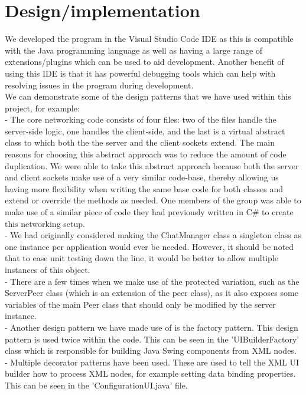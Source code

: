 \documentclass{COMPXXXX}
\begin{document}
\section{Design/implementation}
\normalsize \textrm {We developed the program in the Visual Studio Code IDE as this is compatible with the Java programming language as well as having a large range of extensions/plugins which can be used to aid development. Another benefit of using this IDE is that it has powerful debugging tools which can help with resolving issues in the program during development.\\
We can demonstrate some of the design patterns that we have used within this project, for example:\\
- The core networking code consists of four files: two of the files handle the server-side logic, one handles the client-side, and the last is a virtual abstract class to which both the the server and the client sockets extend. The main reasons for choosing this abstract approach was to reduce the amount of code duplication. We were able to take this abstract approach because both the server and client sockets make use of a very similar code-base, thereby allowing us having more flexibility when writing the same base code for both classes and extend or override the methods as needed. One members of the group was able to make use of a similar piece of code they had previously written in C\# \cite{csharptools_pipes} to create this networking setup.\\
- We had originally considered making the ChatManager class a singleton class as one instance per application would ever be needed. However, it should be noted that to ease unit testing down the line, it would be better to allow multiple instances of this object.\\
- There are a few times when we make use of the protected variation, such as the ServerPeer class (which is an extension of the peer class), as it also exposes some variables of the main Peer class that should only be modified by the server instance.\\
- Another design pattern we have made use of is the factory pattern. This design pattern is used twice within the code. This can be seen in the 'UIBuilderFactory' class which is responsible for building Java Swing components from XML nodes.\\
- Multiple decorator patterns have been used. These are used to tell the XML UI builder how to process XML nodes, for example setting data binding properties. This can be seen in the 'ConfigurationUI.java' file.}
\end{document}

